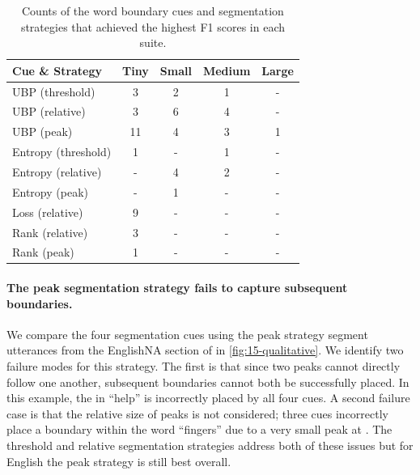 \begin{table}[]
    \centering
    \small
    \begin{tabular}{lcccc}
    \toprule
    Cue \& Strategy & Tiny & Small & Medium & Large \\
    \midrule
    UBP (threshold) & 3 & 2 & 1 & - \\
    UBP (relative) & 3 & 6 & 4 & - \\
    UBP (peak) & 11 & 4 & 3 & 1 \\
    Entropy (threshold) & 1 & - & 1 & - \\
    Entropy (relative) & - & 4 & 2 & - \\
    Entropy (peak) & - & 1 & - & - \\
    Loss (relative) & 9 & - & - & - \\
    Rank (relative) & 3 & - & - & - \\
    Rank (peak) & 1 & - & - & - \\
    \bottomrule
    \end{tabular}
\caption{Counts of the word boundary cues and segmentation strategies that achieved the highest F1 scores in each suite.}
\label{tab:15-bestcues}
\end{table}


\paragraph{The peak segmentation strategy fails to capture subsequent boundaries.}
We compare the four segmentation cues using the peak strategy segment utterances from the EnglishNA section of \ipachildes in \cref{fig:15-qualitative}. We identify two failure modes for this strategy. The first is that since two peaks cannot directly follow one another, subsequent boundaries cannot both be successfully placed. In this example, the  in ``help'' is incorrectly placed by all four cues. A second failure case is that the relative size of peaks is not considered; three cues incorrectly place a boundary within the word ``fingers'' due to a very small peak at \ttipa{\textschwa}. The threshold and relative segmentation strategies address both of these issues but for English the peak strategy is still best overall.

